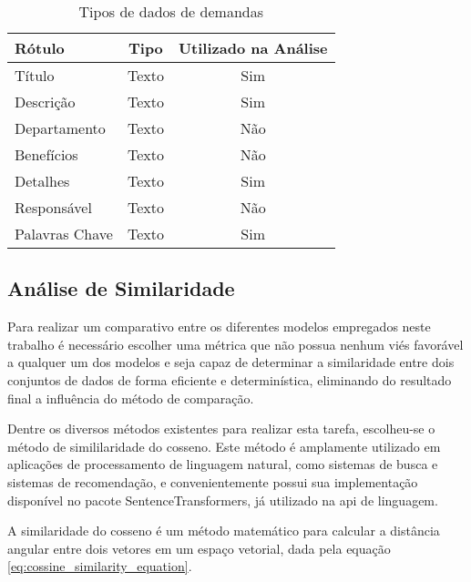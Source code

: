 \begin{table}[H]
    \caption{Tipos de dados de demandas}
    \label{tab:dados_demandas}
    \begin{tabular}{lcc}
        \hline
        \textbf{Rótulo} & \textbf{Tipo} & \textbf{Utilizado na Análise} \\ \hline
        Título          & Texto         & Sim                           \\
        Descrição       & Texto         & Sim                           \\
        Departamento    & Texto         & Não                           \\
        Benefícios      & Texto         & Não                           \\
        Detalhes        & Texto         & Sim                           \\
        Responsável     & Texto         & Não                           \\
        Palavras Chave  & Texto         & Sim                           \\ \hline
    \end{tabular}
    \fonte{}
\end{table}

\subsection{Análise de Similaridade}\label{subsec:cossine_similarity}

Para realizar um comparativo entre os diferentes modelos empregados neste trabalho é necessário escolher uma métrica que não possua nenhum viés favorável a qualquer um dos modelos e seja capaz de determinar a similaridade entre dois conjuntos de dados de forma eficiente e determinística, eliminando do resultado final a influência do método de comparação.



Dentre os diversos métodos existentes para realizar esta tarefa, escolheu-se o método de simililaridade do cosseno. Este método é amplamente utilizado em aplicações de processamento de linguagem natural, como sistemas de busca e sistemas de recomendação, e convenientemente possui sua implementação disponível no pacote SentenceTransformers, já utilizado na \gls{api} de linguagem.

A similaridade do cosseno é um método matemático para calcular a distância angular entre dois vetores em um espaço vetorial, dada pela equação \ref{eq:cossine_similarity_equation}.

